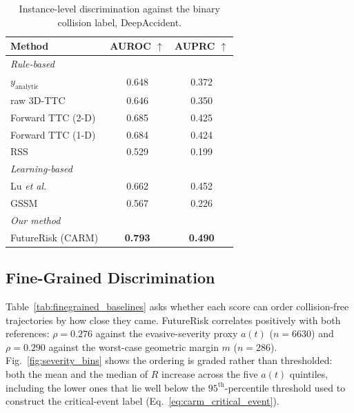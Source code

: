 \documentclass[letterpaper, 10 pt, conference]{ieeeconf}  %
\begin{document}
\begin{table}[t]
\scriptsize
\renewcommand{\arraystretch}{0.92}
\setlength{\tabcolsep}{3.5pt}
\centering
\caption{Instance-level discrimination against the binary collision label,
DeepAccident.}
\label{tab:instance_consistency}
\begin{tabular}{lcc}
\toprule
Method & AUROC $\uparrow$ & AUPRC $\uparrow$ \\
\midrule
\multicolumn{3}{l}{\textit{Rule-based}} \\
$y_{\mathrm{analytic}}$ & 0.648 & 0.372 \\
raw 3D-TTC & 0.646 & 0.350 \\
Forward TTC (2-D)~\cite{li2024beyond} & 0.685 & 0.425 \\
Forward TTC (1-D) & 0.684 & 0.424 \\
RSS~\cite{shalevshwartz2017rss} & 0.529 & 0.199 \\
\midrule
\multicolumn{3}{l}{\textit{Learning-based}} \\
Lu \emph{et al.}~\cite{lu2022learning} & 0.662 & 0.452 \\
GSSM~\cite{jiao2026gssm} & 0.567 & 0.226 \\
\midrule
\multicolumn{3}{l}{\textit{Our method}} \\
FutureRisk (CARM) & \textbf{0.793} & \textbf{0.490} \\
\bottomrule
\end{tabular}
\end{table}

\subsection{Fine-Grained Discrimination}
\label{sec:exp_finegrained}

Table~\ref{tab:finegrained_baselines} asks whether each score can order
collision-free trajectories by how close they came. FutureRisk correlates
positively with both references: $\rho=0.276$ against the evasive-severity
proxy $a(t)$ ($n=6630$) and $\rho=0.290$ against the worst-case geometric
margin $m$ ($n=286$). Fig.~\ref{fig:severity_bins} shows the ordering is
graded rather than thresholded: both the mean and the median of $R$
increase across the five $a(t)$ quintiles, including the lower ones that
lie well below the $95^{\mathrm{th}}$-percentile threshold used to
construct the critical-event label (Eq.~\eqref{eq:carm_critical_event}).
\end{document}

